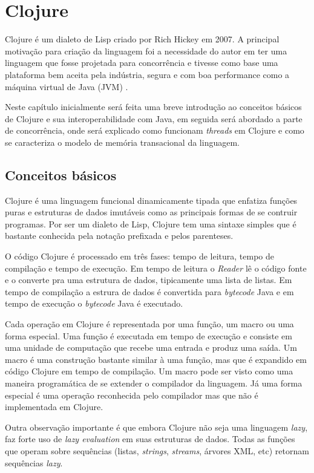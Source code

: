 \chapter{Clojure}

Clojure é um dialeto de Lisp criado por Rich Hickey em 2007. A principal motivação para criação da linguagem foi a necessidade do autor em ter uma linguagem que fosse projetada para concorrência e tivesse como base uma plataforma bem aceita pela indústria, segura e com boa performance como a máquina virtual de Java (JVM) \cite{hickey2010clojurerationale}.

Neste capítulo inicialmente será feita uma breve introdução ao conceitos básicos de Clojure e sua interoperabilidade com Java, em seguida será abordado a parte de concorrência, onde será explicado como funcionam \emph{threads} em Clojure e como se caracteriza o modelo de memória transacional da linguagem.


\section{Conceitos básicos}

Clojure é uma linguagem funcional dinamicamente tipada que enfatiza funções puras e estruturas de dados imutáveis como as principais formas de se contruir programas. Por ser um dialeto de Lisp, Clojure tem uma sintaxe simples que é bastante conhecida pela notação prefixada e pelos parenteses.

O código Clojure é processado em três fases: tempo de leitura, tempo de compilação e tempo de execução. Em tempo de leitura o \emph{Reader} lê o código fonte e o converte pra uma estrutura de dados, tipicamente uma lista de listas. Em tempo de compilação a estrura de dados é convertida para \emph{bytecode} Java e em tempo de execução o \emph{bytecode} Java é executado. \cite{volkmann2009stm}

Cada operação em Clojure é representada por uma função, um macro ou uma forma especial. Uma função é executada em tempo de execução e consiste em uma unidade de computação que recebe uma entrada e produz uma saída. Um macro é uma construção bastante similar à uma função, mas que é expandido em código Clojure em tempo de compilação. Um macro pode ser visto como uma maneira programática de se extender o compilador da linguagem. Já uma forma especial é uma operação reconhecida pelo compilador mas que não é implementada em Clojure.

Outra observação importante é que embora Clojure não seja uma linguagem \emph{lazy}, faz forte uso de \emph{lazy evaluation} em suas estruturas de dados. Todas as funções que operam sobre sequências (listas, \emph{strings}, \emph{streams}, árvores XML, etc) retornam sequências \emph{lazy}.

